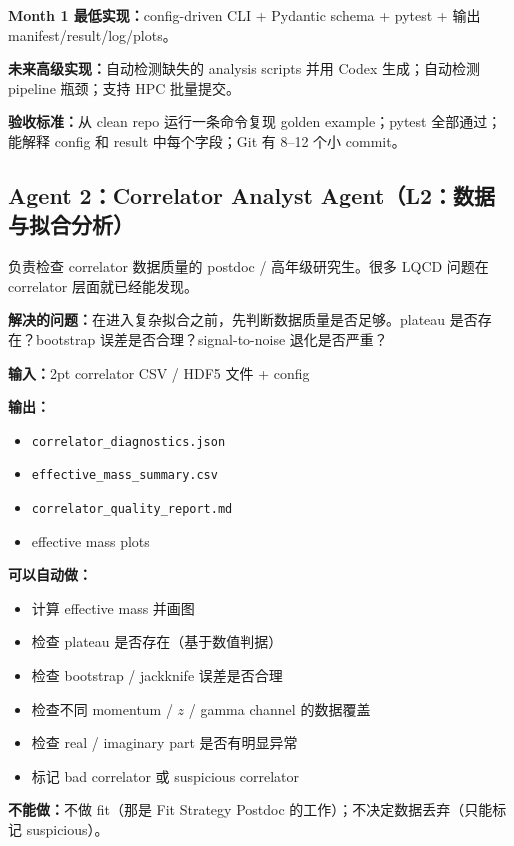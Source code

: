 \documentclass[11pt,a4paper,fontset=fandol]{ctexart}
\begin{document}
\textbf{Month 1 最低实现：}config-driven CLI + Pydantic schema + pytest + 输出 manifest/result/log/plots。

\textbf{未来高级实现：}自动检测缺失的 analysis scripts 并用 Codex 生成；自动检测 pipeline 瓶颈；支持 HPC 批量提交。

\textbf{验收标准：}从 clean repo 运行一条命令复现 golden example；pytest 全部通过；能解释 config 和 result 中每个字段；Git 有 8--12 个小 commit。

\subsection{Agent 2：Correlator Analyst Agent（L2：数据与拟合分析）}

\begin{tcolorbox}[colback=gray!5,colframe=gray!50,title=真实科研组类比]
负责检查 correlator 数据质量的 postdoc / 高年级研究生。很多 LQCD 问题在 correlator 层面就已经能发现。
\end{tcolorbox}

\textbf{解决的问题：}在进入复杂拟合之前，先判断数据质量是否足够。plateau 是否存在？bootstrap 误差是否合理？signal-to-noise 退化是否严重？

\textbf{输入：}2pt correlator CSV / HDF5 文件 + config

\textbf{输出：}
\begin{itemize}
  \item \texttt{correlator\_diagnostics.json}
  \item \texttt{effective\_mass\_summary.csv}
  \item \texttt{correlator\_quality\_report.md}
  \item effective mass plots
\end{itemize}

\textbf{可以自动做：}
\begin{itemize}
  \item 计算 effective mass 并画图
  \item 检查 plateau 是否存在（基于数值判据）
  \item 检查 bootstrap / jackknife 误差是否合理
  \item 检查不同 momentum / $z$ / gamma channel 的数据覆盖
  \item 检查 real / imaginary part 是否有明显异常
  \item 标记 bad correlator 或 suspicious correlator
\end{itemize}

\textbf{不能做：}不做 fit（那是 Fit Strategy Postdoc 的工作）；不决定数据丢弃（只能标记 suspicious）。
\end{document}

